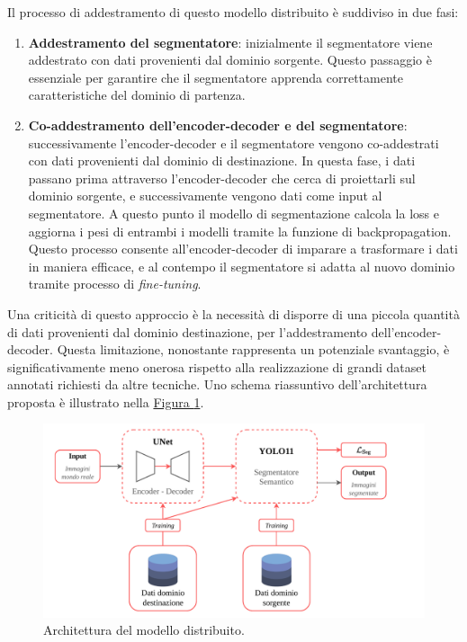 \documentclass[12pt]{report}
\begin{document}
Il processo di addestramento di questo modello distribuito è suddiviso in due fasi:

\begin{enumerate}
	\item \textbf{Addestramento del segmentatore}: inizialmente il segmentatore viene addestrato con dati provenienti dal dominio sorgente. Questo passaggio è essenziale per garantire che il segmentatore apprenda correttamente caratteristiche del dominio di partenza.
	
	\item \textbf{Co-addestramento dell'encoder-decoder e del segmentatore}: successivamente l'encoder-decoder e il segmentatore vengono co-addestrati con dati provenienti dal dominio di destinazione. In questa fase, i dati passano prima attraverso l'encoder-decoder che cerca di proiettarli sul dominio sorgente, e successivamente vengono dati come input al segmentatore. A questo punto il modello di segmentazione calcola la loss e aggiorna i pesi di entrambi i modelli tramite la funzione di backpropagation. Questo processo consente all'encoder-decoder di imparare a trasformare i dati in maniera efficace, e al contempo il segmentatore si adatta al nuovo dominio tramite processo di \textit{fine-tuning}.
\end{enumerate}

Una criticità di questo approccio è la necessità di disporre di una piccola quantità di dati provenienti dal dominio destinazione, per l'addestramento dell'encoder-decoder. Questa limitazione, nonostante rappresenta un potenziale svantaggio, è significativamente meno onerosa rispetto alla realizzazione di grandi dataset annotati richiesti da altre tecniche. Uno schema riassuntivo dell'architettura proposta è illustrato nella \hyperref[fig:architettura-unet-yolo]{Figura \ref{fig:architettura-unet-yolo}}.

\begin{figure}[t]
	\centering
	\includegraphics[width=\textwidth, clip]{images/unet-yolo-architecture}
	\caption{Architettura del modello distribuito.}
	\label{fig:architettura-unet-yolo}
\end{figure}
\end{document}
